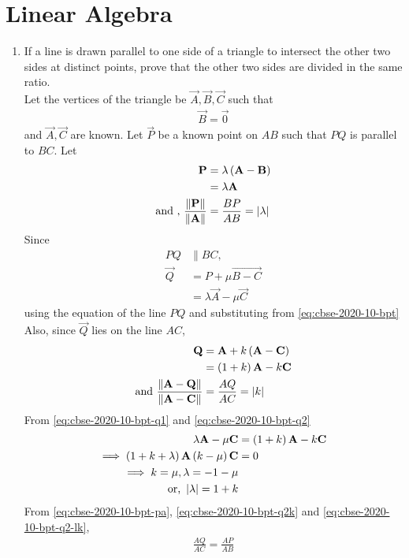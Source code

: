 \documentclass[journal,12pt,twocolumn]{IEEEtran}
\begin{document}
\section{Linear Algebra}
\begin{enumerate}
    \item If a line is drawn parallel to one side of a triangle to intersect the other two sides at distinct points, prove that the other two sides are divided in the same ratio.\\
	    \solution Let the vertices of the triangle be $\vec{A}, \vec{B}, \vec{C}$ such that  
		\begin{align}
			\vec{B} =\vec{0} 
		\end{align}
		and $\vec{A}, \vec{C}$ are known. Let $\vec{P}$ be a known point on $AB$ such that $PQ$ is parallel to $BC$.  Let 
		\begin{align}
			\mathbf{P} &= \lambda \left(\mathbf{A} -\mathbf{B} \right)
			\\
			&=\lambda 
			 \mathbf{A} 
			\label{eq:cbse-2020-10-bpt}
			\\
			\text{and , } \frac{\left\lVert\mathbf{P} 
			\right\rVert}{\left\lVert\mathbf{A}\right\rVert } &= \frac{BP}{AB}= \left\vert\lambda\right\vert
			\label{eq:cbse-2020-10-bpt-pa}
		\end{align}
		Since 
		\begin{align}
			PQ &\parallel BC,
			\\
			\vec{Q} &= P + \mu \vec{B-C}
			\\
			&= \lambda \vec{A} - \mu \vec{C}
			\label{eq:cbse-2020-10-bpt-q1}
		\end{align}
		using the equation of the line $PQ$  and substituting from 
			\eqref{eq:cbse-2020-10-bpt}
			Also, since $\vec{Q}$  lies on the line $AC$, 
		\begin{align}
			\mathbf{Q} &= \mathbf{A} + k \left(\mathbf{A}-\mathbf{C}\right)
			\\
			&= \left(1 + k\right)\mathbf{A} - k \mathbf{C}
			\label{eq:cbse-2020-10-bpt-q2}
			\\
			\text{and }\frac{\left\lVert{\mathbf{A}-\mathbf{Q}}\right\rVert}{\left\lVert{\mathbf{A}-\mathbf{C}}\right\rVert} &= \frac{AQ}{AC}= \left\vert k\right\vert
			\label{eq:cbse-2020-10-bpt-q2k}
		\end{align}
			From \eqref{eq:cbse-2020-10-bpt-q1} and 
			\eqref{eq:cbse-2020-10-bpt-q2}
		\begin{align}
			\lambda \mathbf{A} - \mu \mathbf{C}	&= 
			 \left(1 + k\right)\mathbf{A} - k \mathbf{C}
			\\
			\implies 
			\left(1 + k+\lambda \right)\mathbf{A} \left(k - \mu\right)  \mathbf{C}	&=  0
			\\
			\implies k = \mu, \lambda = -1 - \mu 
			\\
			\text{or, } \left\vert\lambda \right\vert = 1 + k
			\label{eq:cbse-2020-10-bpt-q2-lk}
		\end{align}
		From 
			\eqref{eq:cbse-2020-10-bpt-pa},  
			\eqref{eq:cbse-2020-10-bpt-q2k} and
			\eqref{eq:cbse-2020-10-bpt-q2-lk},
			\begin{align}
				\frac{AQ}{AC} = \frac{AP}{AB}
			\end{align}
		

\end{enumerate}
\end{document}
